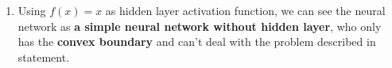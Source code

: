 \documentclass[12pt]{article}
\begin{document}
\begin{enumerate}[label=(\alph*)]
$$\begin{matrix}
            1 \\
            h_1 \\
            h_2\\
            h_3\\
        \end{matrix}\right]
        $$
        Once the point is in the triangle, the first product will be 
        $$
        \left[\begin{matrix}
            1 \\
            1 \\
            1 \\
        \end{matrix}\right]
        $$ 
        So the second product will be -0.67 and the final result will be 0.
        Otherwise, the second product will be larger or equal to 0.33 and the final result will be 1.
        \item Using $f(x)=x$ as hidden layer activation function, we can see the neural network as \textbf{a simple neural network without hidden layer},
        who only has the \textbf{convex boundary} and can't deal with the problem described in statement.
    \end{enumerate}
\end{document}
